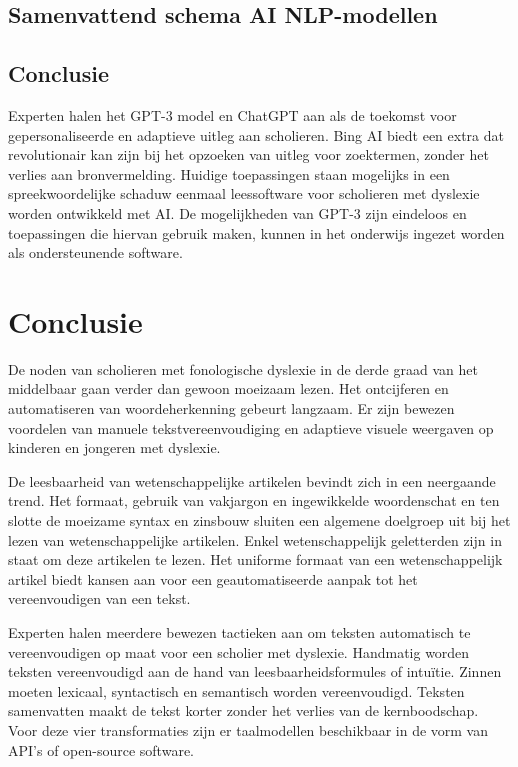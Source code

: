 \subsection{Samenvattend schema AI NLP-modellen}

\subsection{Conclusie}

Experten halen het GPT-3 model en ChatGPT aan als de toekomst voor gepersonaliseerde en adaptieve uitleg aan scholieren. Bing AI biedt een extra dat revolutionair kan zijn bij het opzoeken van uitleg voor zoektermen, zonder het verlies aan bronvermelding. Huidige toepassingen staan mogelijks in een spreekwoordelijke schaduw eenmaal leessoftware voor scholieren met dyslexie worden ontwikkeld met AI. De mogelijkheden van GPT-3 zijn eindeloos en toepassingen die hiervan gebruik maken, kunnen in het onderwijs ingezet worden als ondersteunende software.

\section{Conclusie}

De noden van scholieren met fonologische dyslexie in de derde graad van het middelbaar gaan verder dan gewoon moeizaam lezen.  Het ontcijferen en automatiseren van woordeherkenning gebeurt langzaam. Er zijn bewezen voordelen van manuele tekstvereenvoudiging en adaptieve visuele weergaven op kinderen en jongeren met dyslexie. %

De leesbaarheid van wetenschappelijke artikelen bevindt zich in een neergaande trend. Het formaat, gebruik van vakjargon en ingewikkelde woordenschat en ten slotte de moeizame syntax en zinsbouw sluiten een algemene doelgroep uit bij het lezen van wetenschappelijke artikelen. Enkel wetenschappelijk geletterden zijn in staat om deze artikelen te lezen. Het uniforme formaat van een wetenschappelijk artikel biedt kansen aan voor een geautomatiseerde aanpak tot het vereenvoudigen van een tekst.

Experten halen meerdere bewezen tactieken aan om teksten automatisch te vereenvoudigen op maat voor een scholier met dyslexie. Handmatig worden teksten vereenvoudigd aan de hand van leesbaarheidsformules of intuïtie. Zinnen moeten lexicaal, syntactisch en semantisch worden vereenvoudigd. Teksten samenvatten maakt de tekst korter zonder het verlies van de kernboodschap. Voor deze vier transformaties zijn er taalmodellen beschikbaar in de vorm van API's of open-source software.

